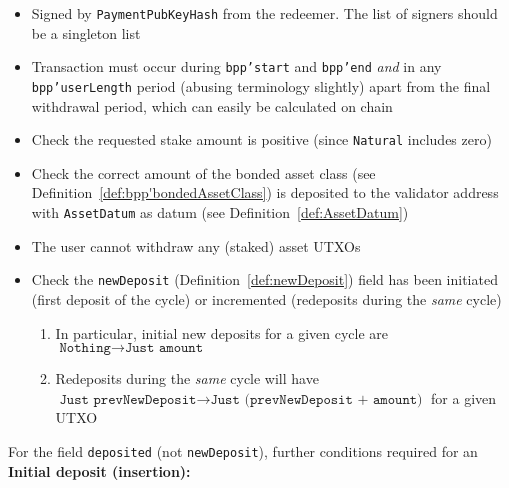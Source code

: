 \documentclass[10pt, a4paper]{article}
\theoremstyle{definition}
\begin{document}
\begin{itemize}
\item{Signed by \texttt{PaymentPubKeyHash} from the redeemer. The list of signers should be a singleton list}
\item{Transaction must occur during \texttt{bpp'start} and \texttt{bpp'end} \textit{and} in any \texttt{bpp'userLength} period (abusing terminology slightly) apart from the final withdrawal period, which can easily be calculated on chain}
\item{Check the requested stake amount is positive (since \texttt{Natural} includes zero)}
\item{Check the correct amount of the bonded asset class (see Definition~\ref{def:bpp'bondedAssetClass}) is deposited to the validator address with \texttt{AssetDatum} as datum (see Definition~\ref{def:AssetDatum})}
\item{The user cannot withdraw any (staked) asset UTXOs}
\item{Check the \texttt{newDeposit} (Definition~\ref{def:newDeposit}) field has been initiated (first deposit of the cycle) or incremented (redeposits during the \textit{same} cycle)
\begin{enumerate}
\item{In particular, initial new deposits for a given cycle are $\texttt{Nothing} \rightarrow \texttt{Just amount}$}
\item{Redeposits during the \textit{same} cycle will have $\texttt{Just prevNewDeposit} \rightarrow \texttt{Just (prevNewDeposit + amount)}$ for a given UTXO}
\end{enumerate}}
\end{itemize}
For the field \texttt{deposited} (not \texttt{newDeposit}), further conditions required for an \textbf{Initial deposit (insertion):}
\end{document}

